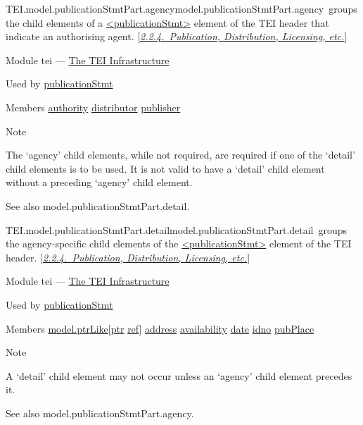\begin{reflist}
\item[]\begin{specHead}{TEI.model.publicationStmtPart.agency}{model.publicationStmtPart.agency} groups the child elements of a \hyperref[TEI.publicationStmt]{<publicationStmt>} element of the TEI header that indicate an authorising agent. [\textit{\hyperref[HD24]{2.2.4.\ Publication, Distribution, Licensing, etc.}}]\end{specHead} 
    \item[{Module}]
  tei — \hyperref[ST]{The TEI Infrastructure}
    \item[{Used by}]
  \hyperref[TEI.publicationStmt]{publicationStmt}
    \item[{Members}]
  \hyperref[TEI.authority]{authority} \hyperref[TEI.distributor]{distributor} \hyperref[TEI.publisher]{publisher}
    \item[{Note}]
  \par
The ‘agency’ child elements, while not required, are required if one of the ‘detail’ child elements is to be used. It is not valid to have a ‘detail’ child element without a preceding ‘agency’ child element.\par
See also \textsf{model.publicationStmtPart.detail}.
\end{reflist}  
\begin{reflist}
\item[]\begin{specHead}{TEI.model.publicationStmtPart.detail}{model.publicationStmtPart.detail} groups the agency-specific child elements of the \hyperref[TEI.publicationStmt]{<publicationStmt>} element of the TEI header. [\textit{\hyperref[HD24]{2.2.4.\ Publication, Distribution, Licensing, etc.}}]\end{specHead} 
    \item[{Module}]
  tei — \hyperref[ST]{The TEI Infrastructure}
    \item[{Used by}]
  \hyperref[TEI.publicationStmt]{publicationStmt}
    \item[{Members}]
  \hyperref[TEI.model.ptrLike]{model.ptrLike}[\hyperref[TEI.ptr]{ptr} \hyperref[TEI.ref]{ref}] \hyperref[TEI.address]{address} \hyperref[TEI.availability]{availability} \hyperref[TEI.date]{date} \hyperref[TEI.idno]{idno} \hyperref[TEI.pubPlace]{pubPlace}
    \item[{Note}]
  \par
A ‘detail’ child element may not occur unless an ‘agency’ child element precedes it.\par
See also \textsf{model.publicationStmtPart.agency}.
\end{reflist}  
